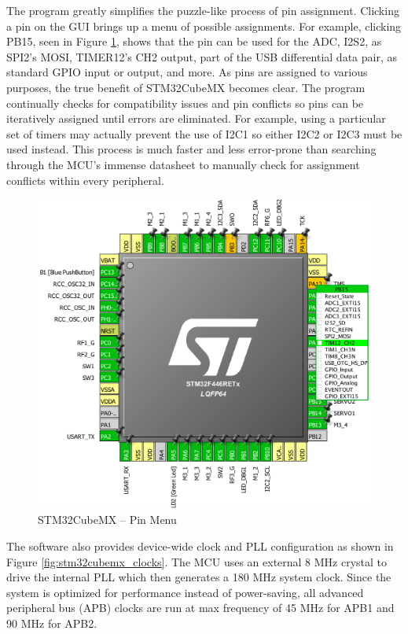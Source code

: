 The program greatly simplifies the puzzle-like process of pin assignment. Clicking a pin on the GUI brings up a menu of possible assignments. For example, clicking PB15, seen in Figure \ref{fig:stm32cubemx_pin}, shows that the pin can be used for the ADC, I2S2, as SPI2's MOSI, TIMER12's CH2 output, part of the USB differential data pair, as standard GPIO input or output, and more. As pins are assigned to various purposes, the true benefit of STM32CubeMX becomes clear. The program continually checks for compatibility issues and pin conflicts so pins can be iteratively assigned until errors are eliminated. For example, using a particular set of timers may actually prevent the use of I2C1 so either I2C2 or I2C3 must be used instead. This process is much faster and less error-prone than searching through the MCU's immense datasheet to manually check for assignment conflicts within every peripheral.

\begin{figure}[H]   %
	\centering \includegraphics[width=6in, keepaspectratio]{figures/stm32cubemx_pin.png}
	\caption{STM32CubeMX -- Pin Menu}\label{fig:stm32cubemx_pin}
\end{figure}

The software also provides device-wide clock and PLL configuration as shown in Figure \ref{fig:stm32cubemx_clocks}. The MCU uses an external 8 MHz crystal to drive the internal PLL which then generates a 180 MHz system clock. Since the system is optimized for performance instead of power-saving, all advanced peripheral bus (APB) clocks are run at max frequency of 45 MHz for APB1 and 90 MHz for APB2. 

